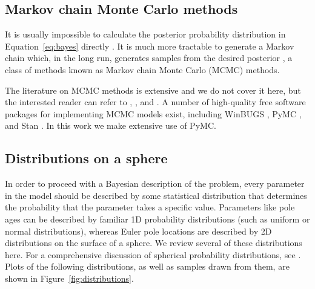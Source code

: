 \documentclass[preprint,12pt,authoryear]{elsarticle}
\begin{document}
\subsection{Markov chain Monte Carlo methods}

It is usually impossible to calculate the posterior
probability distribution in Equation~\eqref{eq:bayes} directly \citep{davidson2015bayesian}. 
It is much more tractable to generate a Markov chain which, in the long run,
generates samples from the desired posterior \citep{gelman2014bayesian}, a
class of methods known as Markov chain Monte Carlo (MCMC) methods.

The literature on MCMC methods is extensive and we do not cover it here, but
the interested reader can refer to \citet{gelman1996markov}, \citet{sambridge2013transdimensional},
and \citet{davidson2015bayesian}. A number of high-quality free software packages
for implementing MCMC models exist, including WinBUGS \citep{lunn2000winbugs}, 
PyMC \citep{patil2010pymc}, and Stan \citep{carpenter2016stan}.
In this work we make extensive use of PyMC.

\subsection{Distributions on a sphere}

In order to proceed with a Bayesian description of the problem, every parameter
in the model should be described by some statistical distribution that determines
the probability that the parameter takes a specific value.
Parameters like pole ages can be described by familiar 1D probability distributions
(such as uniform or normal distributions), whereas Euler pole locations are
described by 2D distributions on the surface of a sphere.
We review several of these distributions here.
For a comprehensive discussion of spherical probability distributions,
see \citet{fisher1987statistical}. Plots of the following distributions, as well as
samples drawn from them, are shown in Figure~\ref{fig:distributions}. 
\end{document}
